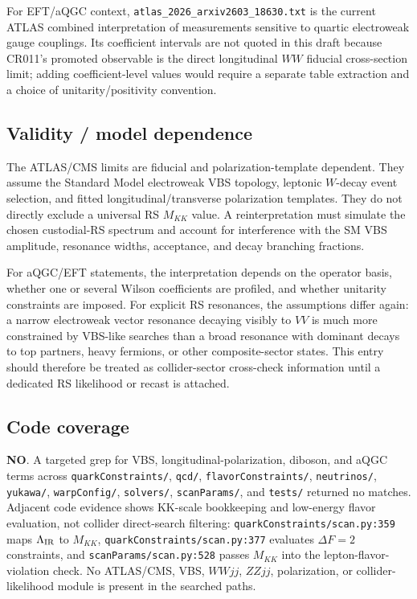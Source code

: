 For EFT/aQGC context, \texttt{atlas\_2026\_arxiv2603\_18630.txt} is the current
ATLAS combined interpretation of measurements sensitive to quartic electroweak
gauge couplings.  Its coefficient intervals are not quoted in this draft
because CR011's promoted observable is the direct longitudinal \(WW\) fiducial
cross-section limit; adding coefficient-level values would require a separate
table extraction and a choice of unitarity/positivity convention.

\subsection*{Validity / model dependence}
The ATLAS/CMS limits are fiducial and polarization-template dependent.  They
assume the Standard Model electroweak VBS topology, leptonic \(W\)-decay event
selection, and fitted longitudinal/transverse polarization templates.  They do
not directly exclude a universal RS \(M_{KK}\) value.  A reinterpretation must
simulate the chosen custodial-RS spectrum and account for interference with the
SM VBS amplitude, resonance widths, acceptance, and decay branching fractions.

For aQGC/EFT statements, the interpretation depends on the operator basis,
whether one or several Wilson coefficients are profiled, and whether unitarity
constraints are imposed.  For explicit RS resonances, the assumptions differ
again: a narrow electroweak vector resonance decaying visibly to \(VV\) is much
more constrained by VBS-like searches than a broad resonance with dominant
decays to top partners, heavy fermions, or other composite-sector states.  This
entry should therefore be treated as collider-sector cross-check information
until a dedicated RS likelihood or recast is attached.

\subsection*{Code coverage}
\textbf{NO}.  A targeted grep for VBS, longitudinal-polarization, diboson, and
aQGC terms across \texttt{quarkConstraints/}, \texttt{qcd/},
\texttt{flavorConstraints/}, \texttt{neutrinos/}, \texttt{yukawa/},
\texttt{warpConfig/}, \texttt{solvers/}, \texttt{scanParams/}, and
\texttt{tests/} returned no matches.  Adjacent code evidence shows KK-scale
bookkeeping and low-energy flavor evaluation, not collider direct-search
filtering: \texttt{quarkConstraints/scan.py:359} maps
\(\Lambda_{\rm IR}\) to \(M_{KK}\), \texttt{quarkConstraints/scan.py:377}
evaluates \(\Delta F=2\) constraints, and \texttt{scanParams/scan.py:528}
passes \(M_{KK}\) into the lepton-flavor-violation check.  No ATLAS/CMS,
VBS, \(WWjj\), \(ZZjj\), polarization, or collider-likelihood module is
present in the searched paths.

